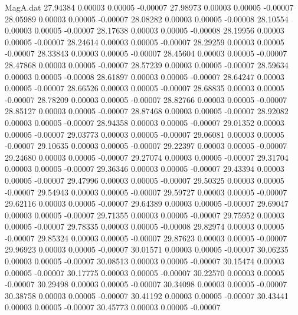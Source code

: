 \begin{filecontents}{MagA.dat}
  27.94384    0.00003    0.00005   -0.00007
  27.98973    0.00003    0.00005   -0.00007
  28.05989    0.00003    0.00005   -0.00007
  28.08282    0.00003    0.00005   -0.00008
  28.10554    0.00003    0.00005   -0.00007
  28.17638    0.00003    0.00005   -0.00008
  28.19956    0.00003    0.00005   -0.00007
  28.24614    0.00003    0.00005   -0.00007
  28.29259    0.00003    0.00005   -0.00007
  28.33843    0.00003    0.00005   -0.00007
  28.45604    0.00003    0.00005   -0.00007
  28.47868    0.00003    0.00005   -0.00007
  28.57239    0.00003    0.00005   -0.00007
  28.59634    0.00003    0.00005   -0.00008
  28.61897    0.00003    0.00005   -0.00007
  28.64247    0.00003    0.00005   -0.00007
  28.66526    0.00003    0.00005   -0.00007
  28.68835    0.00003    0.00005   -0.00007
  28.78209    0.00003    0.00005   -0.00007
  28.82766    0.00003    0.00005   -0.00007
  28.85127    0.00003    0.00005   -0.00007
  28.87468    0.00003    0.00005   -0.00007
  28.92082    0.00003    0.00005   -0.00007
  28.94358    0.00003    0.00005   -0.00007
  29.01352    0.00003    0.00005   -0.00007
  29.03773    0.00003    0.00005   -0.00007
  29.06081    0.00003    0.00005   -0.00007
  29.10635    0.00003    0.00005   -0.00007
  29.22397    0.00003    0.00005   -0.00007
  29.24680    0.00003    0.00005   -0.00007
  29.27074    0.00003    0.00005   -0.00007
  29.31704    0.00003    0.00005   -0.00007
  29.36346    0.00003    0.00005   -0.00007
  29.43394    0.00003    0.00005   -0.00007
  29.47996    0.00003    0.00005   -0.00007
  29.50325    0.00003    0.00005   -0.00007
  29.54943    0.00003    0.00005   -0.00007
  29.59727    0.00003    0.00005   -0.00007
  29.62116    0.00003    0.00005   -0.00007
  29.64389    0.00003    0.00005   -0.00007
  29.69047    0.00003    0.00005   -0.00007
  29.71355    0.00003    0.00005   -0.00007
  29.75952    0.00003    0.00005   -0.00007
  29.78335    0.00003    0.00005   -0.00008
  29.82974    0.00003    0.00005   -0.00007
  29.85324    0.00003    0.00005   -0.00007
  29.87623    0.00003    0.00005   -0.00007
  29.96923    0.00003    0.00005   -0.00007
  30.01571    0.00003    0.00005   -0.00007
  30.06235    0.00003    0.00005   -0.00007
  30.08513    0.00003    0.00005   -0.00007
  30.15474    0.00003    0.00005   -0.00007
  30.17775    0.00003    0.00005   -0.00007
  30.22570    0.00003    0.00005   -0.00007
  30.29498    0.00003    0.00005   -0.00007
  30.34098    0.00003    0.00005   -0.00007
  30.38758    0.00003    0.00005   -0.00007
  30.41192    0.00003    0.00005   -0.00007
  30.43441    0.00003    0.00005   -0.00007
  30.45773    0.00003    0.00005   -0.00007

\end{filecontents}
